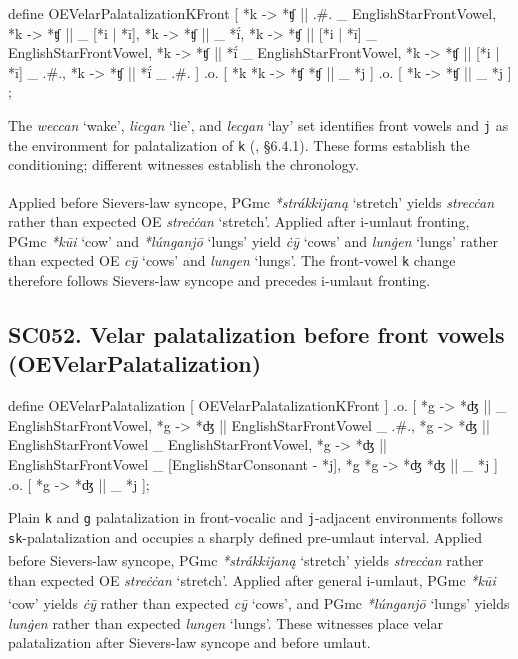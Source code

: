 \documentclass[
  british,
  a4paper,
  openany]{book}
\providecommand{\Pred}[1]{\textsuperscript{\dag}\emph{#1}}
\providecommand{\Recon}[1]{\emph{*#1}}
{\catcode`→=\active \global\def→{\ensuremath{\rightarrow}}}
\providecommand{\texorpdfstring}[2]{#1}
\DeclareRobustCommand{\CAPRRuleHeading}[2]{%
  #1\texorpdfstring{\\(#2)}{ (#2)}%
}
\providecommand{\Pred}[1]{\textsuperscript{\dag}\emph{#1}}
\providecommand{\Recon}[1]{\emph{*#1}}
{\catcode`→=\active \global\def→{\ensuremath{\rightarrow}}}
\begin{document}
\begin{ReaderFacingFoma}
define OEVelarPalatalizationKFront [
    {*k} -> {*ʧ} || .#. _ EnglishStarFrontVowel,
    {*k} -> {*ʧ} || _ [{*i} | {*ī}],
    {*k} -> {*ʧ} || _ {*ḯ},
    {*k} -> {*ʧ} || [{*i} | {*ī}] _ EnglishStarFrontVowel,
    {*k} -> {*ʧ} || {*ḯ} _ EnglishStarFrontVowel,
    {*k} -> {*ʧ} || [{*i} | {*ī}] _ .#.,
    {*k} -> {*ʧ} || {*ḯ} _ .#.
] .o. [
    {*k} {*k} -> {*ʧ} {*ʧ} || _ {*j}
] .o. [
    {*k} -> {*ʧ} || _ {*j}
] ;
\end{ReaderFacingFoma}

The \emph{weccan} `wake', \emph{licgan} `lie', and \emph{lecgan} `lay'
set identifies front vowels and \texttt{j} as the environment for
palatalization of \texttt{k} (, §6.4.1). These forms establish the conditioning;
different witnesses establish the chronology.

Applied before Sievers-law syncope, PGmc \Recon{strákkijaną} `stretch'
yields \Pred{strecċan} rather than expected OE \emph{streċċan}
`stretch'. Applied after i-umlaut fronting, PGmc \Recon{kūi} `cow' and
\Recon{lúnganjō} `lungs' yield \emph{ċȳ} `cows' and \emph{lunġen}
`lungs' rather than expected OE \emph{cȳ} `cows' and \emph{lungen}
`lungs'. The front-vowel \texttt{k} change therefore follows Sievers-law
syncope and precedes i-umlaut fronting.

\subsection{\texorpdfstring{\CAPRRuleHeading{SC052. Velar palatalization before front vowels}{OEVelarPalatalization}}{}}\label{rule-OEVelarPalatalization}

\begin{ReaderFacingFoma}
define OEVelarPalatalization [
    OEVelarPalatalizationKFront
] .o. [
    {*g} -> {*ʤ} || _ EnglishStarFrontVowel,
    {*g} -> {*ʤ} || EnglishStarFrontVowel _ .#.,
    {*g} -> {*ʤ} || EnglishStarFrontVowel _ EnglishStarFrontVowel,
    {*g} -> {*ʤ} || EnglishStarFrontVowel _ [EnglishStarConsonant - {*j}],
    {*g} {*g} -> {*ʤ} {*ʤ} || _ {*j}
] .o. [
    {*g} -> {*ʤ} || _ {*j}
];
\end{ReaderFacingFoma}

Plain \texttt{k} and \texttt{g} palatalization in front-vocalic and
\texttt{j}-adjacent environments follows \texttt{sk}-palatalization and
occupies a sharply defined pre-umlaut interval. Applied before
Sievers-law syncope, PGmc \Recon{strákkijaną} `stretch' yields
\Pred{strecċan} rather than expected OE \emph{streċċan} `stretch'.
Applied after general i-umlaut, PGmc \Recon{kūi} `cow' yields \Pred{ċȳ}
rather than expected \emph{cȳ} `cows', and PGmc \Recon{lúnganjō} `lungs'
yields \Pred{lunġen} rather than expected \emph{lungen} `lungs'. These
witnesses place velar palatalization after Sievers-law syncope and
before umlaut.
\end{document}
